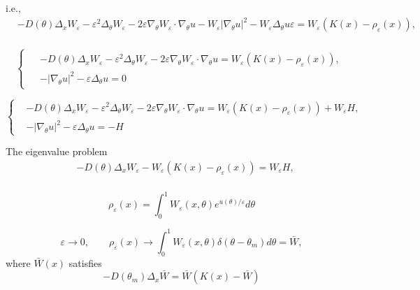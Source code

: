 \documentclass{article}
\begin{document}
i.e.,
\begin{equation}
\begin{aligned}
&-D(\theta)\Delta_x W_\varepsilon -\varepsilon^2\Delta_\theta W_\varepsilon - 2\varepsilon\nabla_\theta W_\varepsilon\cdot \nabla_\theta u - W_\varepsilon |\nabla_\theta u|^2 - W_\varepsilon \Delta_\theta u\varepsilon= W_\varepsilon (K(x)-\rho_\varepsilon(x)),\\
\end{aligned}
\end{equation}

\begin{equation}
\begin{cases}
\begin{aligned}
&-D(\theta)\Delta_x W_\varepsilon -\varepsilon^2\Delta_\theta W_\varepsilon - 2\varepsilon\nabla_\theta W_\varepsilon\cdot \nabla_\theta u = W_\varepsilon (K(x)-\rho_\varepsilon(x)),\\
& - |\nabla_\theta u|^2 - \varepsilon \Delta_\theta u=0
\end{aligned}
\end{cases}
\end{equation}

\begin{equation}
\left\{
\begin{aligned}
&-D(\theta)\Delta_x W_\varepsilon -\varepsilon^2\Delta_\theta W_\varepsilon - 2\varepsilon\nabla_\theta W_\varepsilon\cdot \nabla_\theta u = W_\varepsilon (K(x)-\rho_\varepsilon(x)) + W_\varepsilon H,\\
& - |\nabla_\theta u|^2 - \varepsilon \Delta_\theta u= -H
\end{aligned}
\right.
\end{equation}

The eigenvalue problem
\begin{equation}
\begin{aligned}
&-D(\theta)\Delta_x W_\varepsilon - W_\varepsilon (K(x)-\rho_\varepsilon(x)) = W_\varepsilon H,\\
\end{aligned}
\end{equation}

\begin{equation}
\rho_\varepsilon(x) = \int_0^1 W_\varepsilon(x,\theta) e^{u(\theta)/\varepsilon} d\theta
\end{equation}

\begin{equation}
\varepsilon \to 0, \qquad \rho_\varepsilon(x) \to \int_0^1 W_\varepsilon(x,\theta) \delta(\theta-\theta_m) d\theta = \bar{W},
\end{equation}
where $\bar{W}(x)$ satisfies
$$-D(\theta_m) \Delta_x \bar{W}=\bar{W}(K(x)-\bar{W})$$
\end{document}
